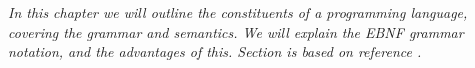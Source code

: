 \textit{In this chapter we will outline the constituents of a programming language, covering the grammar and semantics. We will explain the EBNF grammar notation, and the advantages of this. Section \label{sec:ebnf} is based on reference \cite{misc:spo}.}